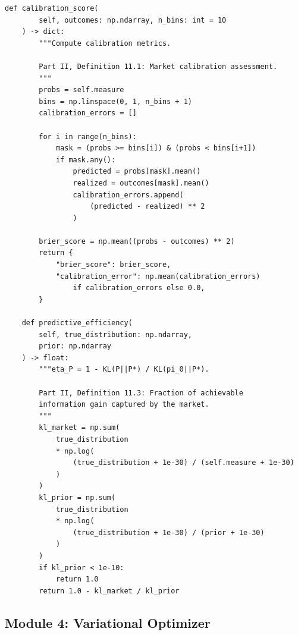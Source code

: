 \documentclass[12pt,a4paper]{article}
\theoremstyle{definition}
\begin{document}
\begin{lstlisting}[caption={Predictive Measure --- Extraction and evaluation (Part~II, \S 3--5)},label=lst:predictive]
    def calibration_score(
        self, outcomes: np.ndarray, n_bins: int = 10
    ) -> dict:
        """Compute calibration metrics.
        
        Part II, Definition 11.1: Market calibration assessment.
        """
        probs = self.measure
        bins = np.linspace(0, 1, n_bins + 1)
        calibration_errors = []
        
        for i in range(n_bins):
            mask = (probs >= bins[i]) & (probs < bins[i+1])
            if mask.any():
                predicted = probs[mask].mean()
                realized = outcomes[mask].mean()
                calibration_errors.append(
                    (predicted - realized) ** 2
                )
        
        brier_score = np.mean((probs - outcomes) ** 2)
        return {
            "brier_score": brier_score,
            "calibration_error": np.mean(calibration_errors)
                if calibration_errors else 0.0,
        }
    
    def predictive_efficiency(
        self, true_distribution: np.ndarray,
        prior: np.ndarray
    ) -> float:
        """eta_P = 1 - KL(P||P*) / KL(pi_0||P*).
        
        Part II, Definition 11.3: Fraction of achievable
        information gain captured by the market.
        """
        kl_market = np.sum(
            true_distribution
            * np.log(
                (true_distribution + 1e-30) / (self.measure + 1e-30)
            )
        )
        kl_prior = np.sum(
            true_distribution
            * np.log(
                (true_distribution + 1e-30) / (prior + 1e-30)
            )
        )
        if kl_prior < 1e-10:
            return 1.0
        return 1.0 - kl_market / kl_prior
\end{lstlisting}

\subsection{Module 4: Variational Optimizer}
\end{document}
